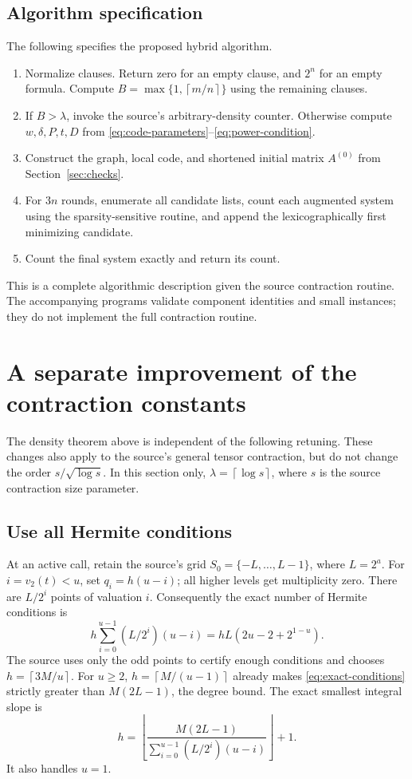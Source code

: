 \documentclass[11pt]{article}
\theoremstyle{remark}
\newcommand{\ceil}[1]{\left\lceil #1\right\rceil}
\newcommand{\floor}[1]{\left\lfloor #1\right\rfloor}
\begin{document}
\subsection{Algorithm specification}
The following specifies the proposed hybrid algorithm.
\begin{enumerate}
\item Normalize clauses. Return zero for an empty clause, and \(2^n\)
for an empty formula. Compute \(B=\max\{1,\ceil{m/n}\}\) using the
remaining clauses.
\item If \(B>\lambda\), invoke the source's arbitrary-density counter.
Otherwise compute \(w,\delta,P,t,D\) from
\eqref{eq:code-parameters}--\eqref{eq:power-condition}.
\item Construct the graph, local code, and shortened initial matrix
\(A^{(0)}\) from Section~\ref{sec:checks}.
\item For \(3n\) rounds, enumerate all candidate lists, count each
augmented system using the sparsity-sensitive routine, and append the
lexicographically first minimizing candidate.
\item Count the final system exactly and return its count.
\end{enumerate}
This is a complete algorithmic description given the source contraction
routine. The accompanying programs validate component identities and
small instances; they do not implement the full contraction routine.

\section{A separate improvement of the contraction constants}\label{sec:retuning}
The density theorem above is independent of the following retuning.
These changes also apply to the source's general tensor contraction,
but do not change the order \(s/\sqrt{\log s}\).
In this section only, \(\lambda=\ceil{\log s}\), where \(s\) is the
source contraction size parameter.

\subsection{Use all Hermite conditions}
At an active call, retain the source's grid
\(S_0=\{-L,\ldots,L-1\}\), where \(L=2^a\).
For \(i=v_2(t)<u\), set \(q_i=h(u-i)\); all higher levels get
multiplicity zero. There are \(L/2^i\) points of valuation \(i\).
Consequently the exact number of Hermite conditions is
\begin{equation}\label{eq:exact-conditions}
 h\sum_{i=0}^{u-1}(L/2^i)(u-i)
   =hL(2u-2+2^{1-u}).
\end{equation}
The source uses only the odd points to certify enough conditions and
chooses \(h=\ceil{3M/u}\).
For \(u\ge2\), \(h=\ceil{M/(u-1)}\) already makes
\eqref{eq:exact-conditions} strictly greater than
\(M(2L-1)\), the degree bound.
The exact smallest integral slope is
\begin{equation}\label{eq:exact-h}
 h=\floor{\frac{M(2L-1)}
     {\sum_{i=0}^{u-1}(L/2^i)(u-i)}}+1.
\end{equation}
It also handles \(u=1\).
\end{document}
